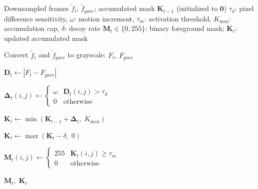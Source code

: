 \documentclass{article}
\begin{document}
\begin{preview}

    \setcounter{algorithm}{2} %

    \begin{algorithm}[H]
        \caption{Accumulation Motion Detector (AccMotionDet)}
        \label{alg:acc_motion_det}
        \begin{algorithmic}[1]

            \Require Downsampled frames $\tilde{f}_t,\,
            \tilde{f}_{\text{prev}}$;
            accumulated mask $\mathbf{K}_{t-1}$ (initialized to $\mathbf{0}$)
            \Require $\tau_d$: pixel difference sensitivity,\;
            $\omega$: motion increment,\;
            $\tau_m$: activation threshold,\;
            $K_{\max}$: accumulation cap,\;
            $\delta$: decay rate
            \Ensure $\mathbf{M}_t \in \{0, 255\}$: binary foreground mask;\;
            $\mathbf{K}_t$: updated accumulated mask

            \Statex

            \State Convert $\tilde{f}_t$ and
            $\tilde{f}_{\text{prev}}$ to grayscale: $F_t,\, F_{\text{prev}}$

            \Statex

            \State $\mathbf{D}_t \leftarrow \left| F_t -
            F_{\text{prev}} \right|$

            \State $\symbf{\Delta}_t(i,j) \leftarrow
            \begin{cases}
                \omega & \mathbf{D}_t(i,j) > \tau_d \\
                0      & \text{otherwise}
            \end{cases}$

            \Statex

            \State $\mathbf{K}_t \leftarrow
            \min\!\left(\mathbf{K}_{t-1} + \symbf{\Delta}_t,\; K_{\max}\right)$

            \State $\mathbf{K}_t \leftarrow \max\!\left(\mathbf{K}_t
            - \delta,\; 0\right)$

            \Statex

            \State $\mathbf{M}_t(i,j) \leftarrow
            \begin{cases}
                255 & \mathbf{K}_t(i,j) \geq \tau_m \\
                0   & \text{otherwise}
            \end{cases}$

            \State \Return $\mathbf{M}_t,\; \mathbf{K}_t$

        \end{algorithmic}
    \end{algorithm}

\end{preview}
\end{document}
